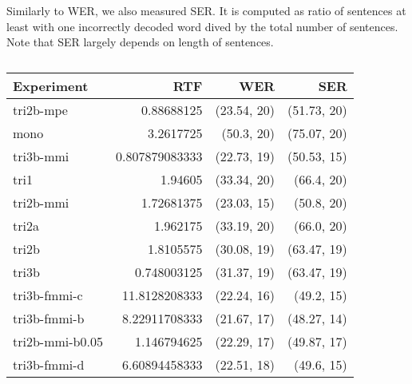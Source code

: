 Similarly to \ac{WER}, we also measured \ac{SER}. It is computed as ratio of sentences at least with one incorrectly decoded word dived by the total number of sentences. Note that \ac{SER} largely depends on length of sentences. 

\begin{table}[!htp]\centering\begin{tabular}{l|rrr}
Experiment      & \ac{RTF}       & \ac{WER}         & \ac{SER} \\
\hline
tri2b-mpe       & 0.88688125     & (23.54, 20) & (51.73, 20)\\
mono            & 3.2617725      & (50.3, 20)  & (75.07, 20)\\
tri3b-mmi       & 0.807879083333 & (22.73, 19) & (50.53, 15)\\
tri1            & 1.94605        & (33.34, 20) & (66.4, 20) \\
tri2b-mmi       & 1.72681375     & (23.03, 15) & (50.8, 20) \\
tri2a           & 1.962175       & (33.19, 20) & (66.0, 20) \\
tri2b           & 1.8105575      & (30.08, 19) & (63.47, 19)\\
tri3b           & 0.748003125    & (31.37, 19) & (63.47, 19)\\
tri3b-fmmi-c    & 11.8128208333  & (22.24, 16) & (49.2, 15) \\
tri3b-fmmi-b    & 8.22911708333  & (21.67, 17) & (48.27, 14)\\
tri2b-mmi-b0.05 & 1.146794625    & (22.29, 17) & (49.87, 17)\\
tri3b-fmmi-d    & 6.60894458333  & (22.51, 18) & (49.6, 15)
\end{tabular}
\caption{}
\end{table}  


